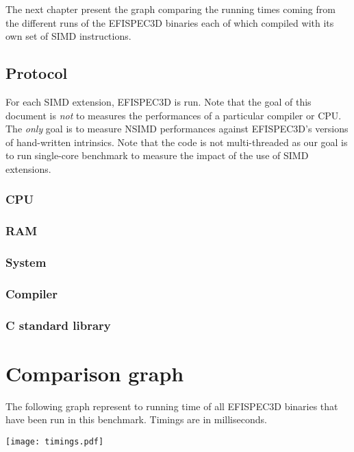 \documentclass[a4paper,11pt]{article}
\newcommand{\efispec}{EFISPEC3D}
\begin{document}
The next chapter present the graph comparing the running times coming from
the different runs of the \efispec{} binaries each of which compiled with its
own set of SIMD instructions.

\subsection{Protocol}

For each SIMD extension, \efispec{} is run. Note that the goal of this document
is \emph{not} to measures the performances of a particular compiler or CPU. The
\emph{only} goal is to measure NSIMD performances against \efispec{}'s versions
of hand-written intrinsics. Note that the code is not multi-threaded as our
goal is to run single-core benchmark to measure the impact of the use of SIMD
extensions.

\subsubsection{CPU}


\subsubsection{RAM}


\subsubsection{System}


\subsubsection{Compiler}


\subsubsection{C standard library}

 
\section{Comparison graph}

The following graph represent to running time of all \efispec{} binaries that
have been run in this benchmark. Timings are in milliseconds.

\begin{center}
  \texttt{[image: timings.pdf]}
\end{center}
\end{document}
